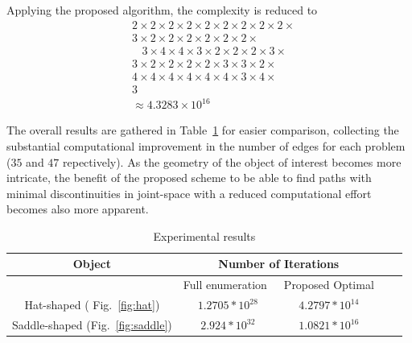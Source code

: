 \documentclass[conference]{IEEEtran}
\begin{document}
Applying the proposed algorithm, the complexity is reduced to
\begin{equation}
\begin{aligned}
&2\times2\times2\times2\times2\times2\times2\times2\times2\times\\
&3\times2\times2\times2\times2\times2\times2\times\\
&~~~~3\times4\times4\times3\times2\times2\times2\times3\times\\
&3\times2\times2\times2\times2\times3\times3\times2\times\\
&4\times4\times4\times4\times4\times4\times3\times4\times\\
&3\\
&\approx 4.3283\times10^{16}
\end{aligned}
\end{equation}

The overall results are gathered in Table~\ref{table:results} for easier comparison, collecting the substantial computational improvement in 
the number of edges for each problem ($35$ and $47$ repectively). As the geometry of the object of interest becomes more intricate, 
the benefit of the proposed scheme to be able to find paths with minimal discontinuities in joint-space with a reduced computational effort 
becomes also more apparent.
\begin{table}
\centering
\caption{Experimental results}
\begin{tabular}{ | c || c | c | c | c | }
 \hline
  Object  & \multicolumn{2}{|c|}{Number of Iterations} \\
 \hline
  						& Full enumeration~\cite{Yang2020Cellular}  &  Proposed Optimal \\
 \hline
 Hat-shaped ( Fig.~\ref{fig:hat})   	& $1.2705*10^{28}$    				&   $4.2797*10^{14}$\\
 \hline
 Saddle-shaped (Fig.~\ref{fig:saddle})					&   $2.924*10^{32}$  		&   	$1.0821*10^{16}$\\
 \hline
\end{tabular}
\label{table:results}
\end{table}


\end{document}
